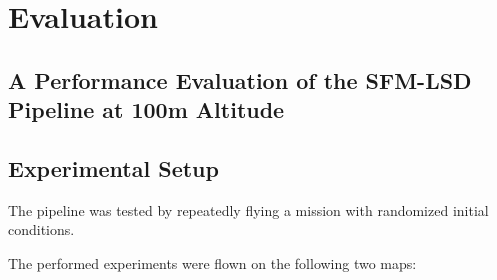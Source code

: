 \chapter{Evaluation}
\label{chapter:evaluation}

\section{A Performance Evaluation of the SFM-LSD Pipeline at 100m Altitude}
\section{Experimental Setup}

The pipeline was tested by repeatedly flying a mission with randomized initial conditions.

The performed experiments were flown on the following two maps:
